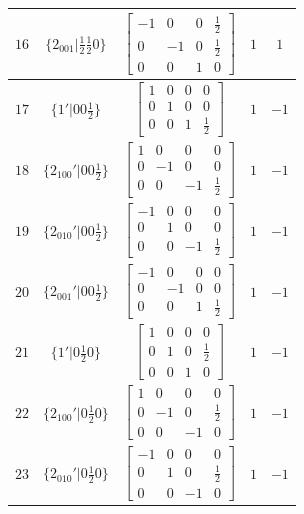 \documentclass[fleqn,8pt]{jsarticle}
\begin{document}
\begin{longtable}{ccccc}
$ 16 $ & $ \{2{}_{001}|\frac{1}{2} \frac{1}{2} 0\} $ & $ \begin{bmatrix} -1 & 0 & 0 & \frac{1}{2} \\ 0 & -1 & 0 & \frac{1}{2} \\ 0 & 0 & 1 & 0 \end{bmatrix} $ & $ 1 $ & $ 1 $ \\ \hline
$ 17 $ & $ \{1{}'|0 0 \frac{1}{2}\} $ & $ \begin{bmatrix} 1 & 0 & 0 & 0 \\ 0 & 1 & 0 & 0 \\ 0 & 0 & 1 & \frac{1}{2} \end{bmatrix} $ & $ 1 $ & $ -1 $ \\ \hline
$ 18 $ & $ \{2{}_{100}{}'|0 0 \frac{1}{2}\} $ & $ \begin{bmatrix} 1 & 0 & 0 & 0 \\ 0 & -1 & 0 & 0 \\ 0 & 0 & -1 & \frac{1}{2} \end{bmatrix} $ & $ 1 $ & $ -1 $ \\ \hline
$ 19 $ & $ \{2{}_{010}{}'|0 0 \frac{1}{2}\} $ & $ \begin{bmatrix} -1 & 0 & 0 & 0 \\ 0 & 1 & 0 & 0 \\ 0 & 0 & -1 & \frac{1}{2} \end{bmatrix} $ & $ 1 $ & $ -1 $ \\ \hline
$ 20 $ & $ \{2{}_{001}{}'|0 0 \frac{1}{2}\} $ & $ \begin{bmatrix} -1 & 0 & 0 & 0 \\ 0 & -1 & 0 & 0 \\ 0 & 0 & 1 & \frac{1}{2} \end{bmatrix} $ & $ 1 $ & $ -1 $ \\ \hline
$ 21 $ & $ \{1{}'|0 \frac{1}{2} 0\} $ & $ \begin{bmatrix} 1 & 0 & 0 & 0 \\ 0 & 1 & 0 & \frac{1}{2} \\ 0 & 0 & 1 & 0 \end{bmatrix} $ & $ 1 $ & $ -1 $ \\ \hline
$ 22 $ & $ \{2{}_{100}{}'|0 \frac{1}{2} 0\} $ & $ \begin{bmatrix} 1 & 0 & 0 & 0 \\ 0 & -1 & 0 & \frac{1}{2} \\ 0 & 0 & -1 & 0 \end{bmatrix} $ & $ 1 $ & $ -1 $ \\ \hline
$ 23 $ & $ \{2{}_{010}{}'|0 \frac{1}{2} 0\} $ & $ \begin{bmatrix} -1 & 0 & 0 & 0 \\ 0 & 1 & 0 & \frac{1}{2} \\ 0 & 0 & -1 & 0 \end{bmatrix} $ & $ 1 $ & $ -1 $ \\ \hline

\end{longtable}
\end{document}
